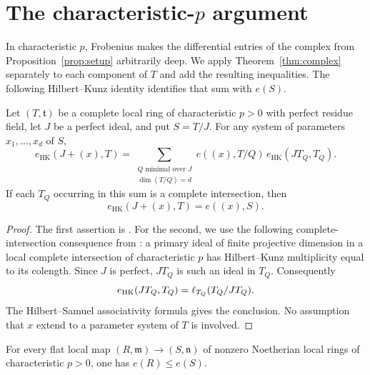 \section{The characteristic-\texorpdfstring{$p$}{p} argument}\label{sec:charp}

In characteristic $p$, Frobenius makes the differential entries of
the complex from Proposition~\ref{prop:setup} arbitrarily deep.
We apply Theorem~\ref{thm:complex} separately to each component of
$T$ and add the resulting inequalities. The following
Hilbert--Kunz identity identifies that sum with $e(S)$.

\begin{lemma}\label{lem:ma-hk}
Let $(T,\mathfrak t)$ be a complete local ring of characteristic
$p>0$ with perfect residue field, let $J$ be a perfect ideal, and put
$S=T/J$.  For any system of parameters $x_1,\ldots,x_d$ of $S$,
\[
 e_{\mathrm{HK}}(J+(x),T)
   =\sum_{\substack{Q\text{ minimal over }J\\\dim(T/Q)=d}}
        e((x),T/Q)\,e_{\mathrm{HK}}(JT_Q,T_Q).
\]
If each $T_Q$ occurring in this sum is a complete intersection, then
\[
       e_{\mathrm{HK}}(J+(x),T)=e((x),S).
\]
\end{lemma}

\begin{proof}
The first assertion is \cite[Lemma~4.2]{Ma}. For the second, we use
the following complete-intersection consequence from
\cite[Section~2.3 and Lemma~4.2]{Ma}: a primary ideal of finite
projective dimension in a local complete intersection of
characteristic $p$ has Hilbert--Kunz multiplicity equal to its
colength. Since $J$ is perfect, $JT_Q$ is such an ideal in $T_Q$.
Consequently
\[
 e_{\mathrm{HK}}(JT_Q,T_Q)=\operatorname{\ell}_{T_Q}(T_Q/JT_Q).
\]
The Hilbert--Samuel associativity formula gives the conclusion.  No
assumption that $x$ extend to a parameter system of $T$ is involved.
\end{proof}

\begin{theorem}\label{thm:positive-characteristic}
For every flat local map $(R,\mathfrak m)\to(S,\mathfrak n)$ of
nonzero Noetherian local rings of characteristic $p>0$, one has
$e(R)\leq e(S)$.
\end{theorem}

